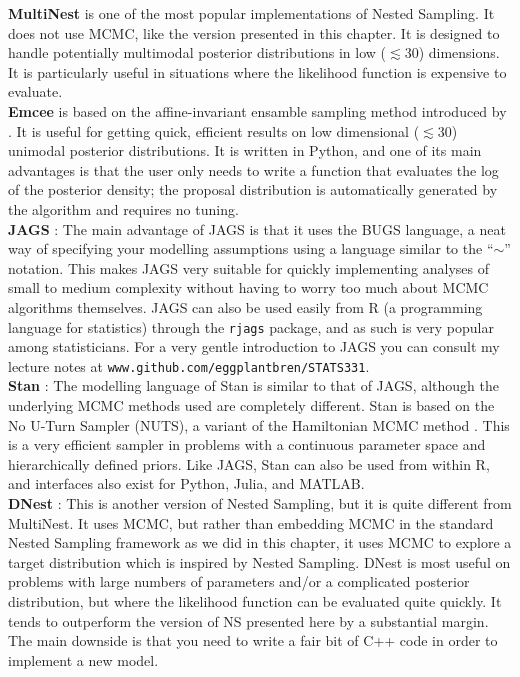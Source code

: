 {\bf MultiNest} \citep{multinest} is one of the most popular implementations of
Nested Sampling. It does not use MCMC, like the version presented in this
chapter. It is designed to handle potentially multimodal posterior
distributions in low ($\lesssim 30$) dimensions. It is particularly useful in
situations where the likelihood function is expensive to evaluate.\\

{\bf Emcee} \citep{emcee} is based on the affine-invariant ensamble sampling
method introduced by \citep{goodman}. It is useful for getting quick, efficient results on low
dimensional ($\lesssim 30$) unimodal posterior distributions.
It is written in Python, and one of its main advantages is that the user only
needs to write a function that evaluates the log of the posterior density;
the proposal distribution is automatically generated by the algorithm and
requires no tuning.\\

{\bf JAGS} \citep{jags}: The main advantage of JAGS is that it
uses the BUGS language, a neat way of specifying your modelling assumptions
using a language similar to the ``$\sim$'' notation. This makes JAGS very
suitable for quickly implementing analyses of small to medium complexity without
having to worry too much about MCMC algorithms themselves. JAGS can also be
used easily from R (a programming language for statistics)
through the {\tt rjags} package, and as such is very popular among
statisticians. For a very gentle
introduction to JAGS you can consult my lecture notes at
{\tt www.github.com/eggplantbren/STATS331}.\\

{\bf Stan} \citep{stan}: The modelling language of Stan is similar to that of
JAGS, although the underlying MCMC methods used are completely different. Stan
is based on the No U-Turn Sampler (NUTS), a variant of the Hamiltonian MCMC
method \citep{hamiltonian}. This is a very efficient sampler in problems with
a continuous parameter space and hierarchically defined priors. Like JAGS,
Stan can also be used from within R, and interfaces also exist for Python,
Julia, and MATLAB.\\

{\bf DNest} \citep{dnest}: This is another version of Nested Sampling, but it
is quite different from MultiNest. It uses MCMC, but rather than embedding
MCMC in the standard Nested Sampling framework as we did in this chapter, it
uses MCMC to explore a target distribution which is inspired by Nested Sampling.
DNest is most useful on problems with large numbers of parameters and/or a
complicated posterior distribution, but where the
likelihood function can be evaluated quite quickly. It tends to outperform
the version of NS presented here by a substantial margin. The main downside is that
you need to write a fair bit of C++ code in order to implement a new model.

